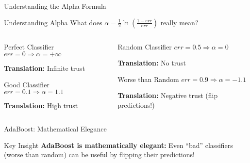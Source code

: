 \documentclass[10pt]{beamer}
\begin{document}
\begin{frame}{Understanding the Alpha Formula}
\begin{keypointsbox}{Understanding Alpha}
What does $\alpha = \frac{1}{2}\ln\left(\frac{1-err}{err}\right)$ really mean?
\end{keypointsbox}

\begin{columns}
\begin{column}{0.5\textwidth}
\begin{definitionbox}{Perfect Classifier}
$err = 0 \Rightarrow \alpha = +\infty$

\textbf{Translation:} Infinite trust
\end{definitionbox}

\begin{examplebox}{Good Classifier}
$err = 0.1 \Rightarrow \alpha = 1.1$

\textbf{Translation:} High trust
\end{examplebox}
\end{column}

\begin{column}{0.5\textwidth}
\begin{alertbox}{Random Classifier}
$err = 0.5 \Rightarrow \alpha = 0$

\textbf{Translation:} No trust
\end{alertbox}

\begin{alertbox}{Worse than Random}
$err = 0.9 \Rightarrow \alpha = -1.1$

\textbf{Translation:} Negative trust (flip predictions!)
\end{alertbox}
\end{column}
\end{columns}
\end{frame}

\begin{frame}{AdaBoost: Mathematical Elegance}
\begin{examplebox}{Key Insight}
\textbf{AdaBoost is mathematically elegant:} Even ``bad'' classifiers (worse than random) can be useful by flipping their predictions!
\end{examplebox}
\end{frame}
\end{document}
